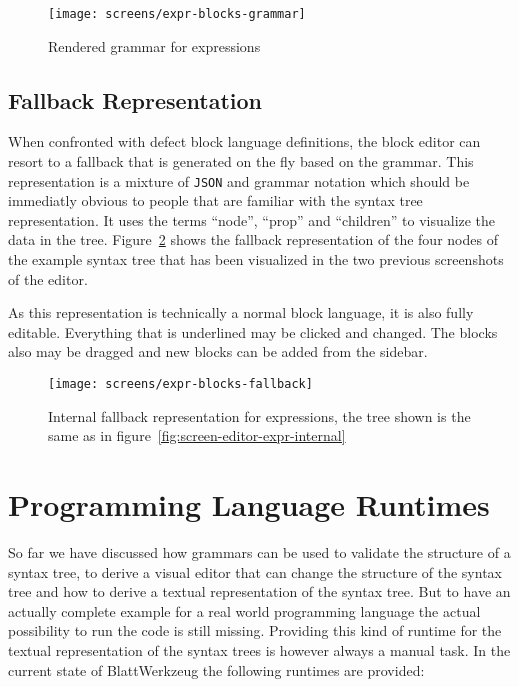 \documentclass[sigconf,natbib=false,review=true,anonymous]{acmart}
\begin{document}
\begin{figure}
  \texttt{[image: screens/expr-blocks-grammar]}
  \caption{Rendered grammar for expressions}
  \label{fig:screen-editor-expr-grammar}
\end{figure}

\subsection{Fallback Representation}

When confronted with defect block language definitions, the block editor can resort to a fallback that is generated on the fly based on the grammar. This representation is a mixture of \texttt{JSON} and grammar notation which should be immediatly obvious to people that are familiar with the syntax tree representation. It uses the terms \enquote{node}, \enquote{prop} and \enquote{children} to visualize the data in the tree. Figure~\ref{fig:screen-editor-expr-fallback} shows the fallback representation of the four nodes of the example syntax tree that has been visualized in the two previous screenshots of the editor.

As this representation is technically a normal block language, it is also fully editable. Everything that is underlined may be clicked and changed. The blocks also may be dragged and new blocks can be added from the sidebar.

\begin{figure}
  \texttt{[image: screens/expr-blocks-fallback]}
  \caption{Internal fallback representation for expressions, the tree shown is the same as in figure~\ref{fig:screen-editor-expr-internal}}
  \label{fig:screen-editor-expr-fallback}
\end{figure}

\section{Programming Language Runtimes}

So far we have discussed how grammars can be used to validate the structure of a syntax tree, to derive a visual editor that can change the structure of the syntax tree and how to derive a textual representation of the syntax tree. But to have an actually complete example for a real world programming language the actual possibility to run the code is still missing. Providing this kind of runtime for the textual representation of the syntax trees is however always a manual task. In the current state of Blatt\-Werkzeug the following runtimes are provided:
\end{document}
